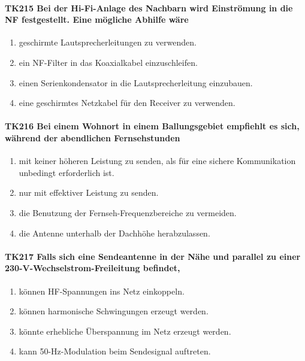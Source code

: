 \documentclass[8pt]{article}
\begin{document}
\paragraph*{TK215 Bei der Hi-Fi-Anlage des Nachbarn wird Einströmung in die NF festgestellt. Eine mögliche Abhilfe wäre} 
\begin{enumerate}[nolistsep,label=\Alph*]
\item geschirmte Lautsprecherleitungen zu verwenden.
\item ein NF-Filter in das Koaxialkabel einzuschleifen.
\item einen Serienkondensator in die Lautsprecherleitung einzubauen.
\item eine geschirmtes Netzkabel für den Receiver zu verwenden.
\end{enumerate}

\paragraph*{TK216 Bei einem Wohnort in einem Ballungsgebiet empfiehlt es sich, während der abendlichen Fernsehstunden}
\begin{enumerate}[nolistsep,label=\Alph*]
\item mit keiner höheren Leistung zu senden, als für eine sichere Kommunikation unbedingt erforderlich ist.
\item nur mit effektiver Leistung zu senden.
\item die Benutzung der Fernseh-Frequenzbereiche zu vermeiden.
\item die Antenne unterhalb der Dachhöhe herabzulassen. 
\end{enumerate}

\paragraph*{TK217 Falls sich eine Sendeantenne in der Nähe und parallel zu einer 230-V-Wechselstrom-Freileitung befindet,} 
\begin{enumerate}[nolistsep,label=\Alph*]
\item können HF-Spannungen ins Netz einkoppeln.
\item können harmonische Schwingungen erzeugt werden.
\item könnte erhebliche Überspannung im Netz erzeugt werden.
\item kann 50-Hz-Modulation beim Sendesignal auftreten. 
\end{enumerate}
\end{document}
